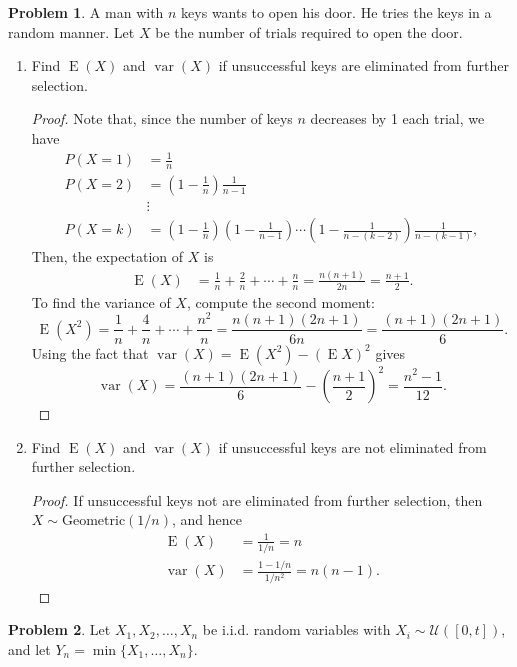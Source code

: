 \documentclass[oneside,reqno]{amsart}
\DeclareMathOperator{\E}{\mathrm{E}}
\DeclareMathOperator{\var}{\mathrm{var}}
\newcommand{\Ucal}{\mathcal{U}}
\theoremstyle{definition}
\newtheorem{prob}{Problem}
\begin{document}
\begin{prob}
A man with $n$ keys wants to open his door. He tries the keys in a random manner. Let $X$ be the number of trials required to open the door. 
\end{prob}


\begin{enumerate}
\item
Find $\E(X)$ and $\var(X)$  if unsuccessful keys are eliminated from further selection.
\begin{proof}
Note that, since the number of keys $n$ decreases by 1 each trial, we have
\begin{align*}
	P(X=1) &= \frac{1}{n} \\
	P(X=2) &= \left(1-\frac{1}{n}\right) \frac{1}{n-1} \\
	&\vdots \\
	P(X=k) &= \left(1-\frac{1}{n}\right)\left(1-\frac{1}{n-1}\right) \cdots \left(1-\frac{1}{n-(k-2)}\right) \frac{1}{n-(k-1)},
\end{align*}
Then, the expectation of $X$ is
\begin{align*}
	\E (X) &= \frac{1}{n} + \frac{2}{n} + \cdots + \frac{n}{n} = \frac{n(n+1)}{2n} = \frac{n+1}{2}.
\end{align*}
To find the variance of $X$, compute the second moment:
\[
	\E (X^2) = \frac{1}{n} + \frac{4}{n} + \cdots + \frac{n^2}{n} = \frac{n(n+1)(2n+1)}{6n}=\frac{(n+1)(2n+1)}{6}.
\]
Using the fact that $\var(X) = \E (X^2) - (\E X)^2$ gives 
\[
	\var(X) = \frac{(n+1)(2n+1)}{6} - \left(  \frac{n+1}{2}  \right)^2 = \frac{n^2-1}{12}.
\]
\end{proof}
\item
Find $\E(X)$ and $\var(X)$ if unsuccessful keys are not eliminated from further selection.
\begin{proof}
If unsuccessful keys not are eliminated from further selection, then $X \sim \text{Geometric}(1/n)$, and hence 
\begin{align*}
	\E (X) &= \frac{1}{1/n} = n \\
	\var(X) &= \frac{1-1/n}{1/n^2} = n (n-1).
\end{align*}
\end{proof}

\end{enumerate}


\begin{prob}
Let $X_1,X_2,\dotsc, X_n$ be i.i.d. random variables with $X_i \sim \Ucal([0,t])$, and let $Y_n = \min\{ X_1,\dotsc, X_n\}$.
\end{prob}
\end{document}
